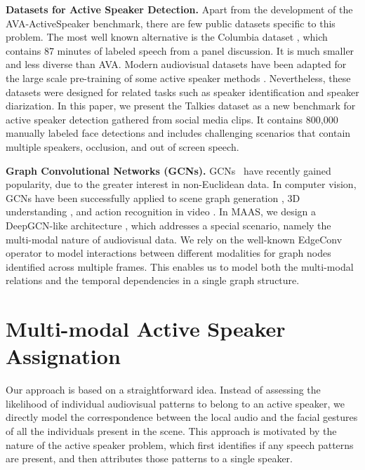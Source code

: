 \documentclass[10pt,twocolumn,letterpaper]{article}
\begin{document}
\noindent
\textbf{Datasets for Active Speaker Detection.}
Apart from the development of the AVA-ActiveSpeaker benchmark, there are few public datasets specific to this problem. The most well known alternative is the Columbia dataset \cite{chakravarty2016active}, which contains 87 minutes of labeled speech from a panel discussion. It is much smaller and less diverse than AVA. Modern audiovisual datasets \cite{nagrani2017voxceleb, chung2016out, chung2020spot} have been adapted for the large scale pre-training of some active speaker methods \cite{chung2019naver}. Nevertheless, these datasets were designed for related tasks such as speaker identification and speaker diarization. In this paper, we present the Talkies dataset as a new benchmark for active speaker detection gathered from social media clips. It contains 800,000 manually labeled face detections and includes challenging scenarios that contain multiple speakers, occlusion, and out of screen speech.


\noindent
\textbf{Graph Convolutional Networks (GCNs).}
GCNs~\cite{kipf2016semi} have recently gained popularity, due to the greater interest in non-Euclidean data. In computer vision, GCNs have been successfully applied to scene graph generation \cite{cv_inv_scene_johnson2018image, cv_scene_li2018factorizable, qi20173d, cv_scene_xu2017scene, cv_scene_yang2018graph}, 3D understanding \cite{Gkioxari2019Mesh, li2019sgas, wang2018dynamic, xie2019clouds}, and action recognition in video \cite{cv_action_jain2016structural, g_tad, cv_action_yan2018spatial}. In MAAS, we design a DeepGCN-like architecture \cite{Li_2019_ICCV,li2019deepgcns_journal,li2020deepergcn}, which addresses a special scenario, namely the multi-modal nature of audiovisual data. We rely on the well-known EdgeConv operator \cite{wang2018dynamic} to model interactions between different modalities for graph nodes identified across multiple frames. This enables us to model both the multi-modal relations and the temporal dependencies in a single graph structure.  

 \section{Multi-modal Active Speaker Assignation}

Our approach is based on a straightforward idea. Instead of assessing the likelihood of individual audiovisual patterns to belong to an active speaker, we directly model the correspondence between the local audio and the facial gestures of all the individuals present in the scene. This approach is motivated by the nature of the active speaker problem, which first identifies if any speech patterns are present, and then attributes those patterns to a single speaker. 
\end{document}
